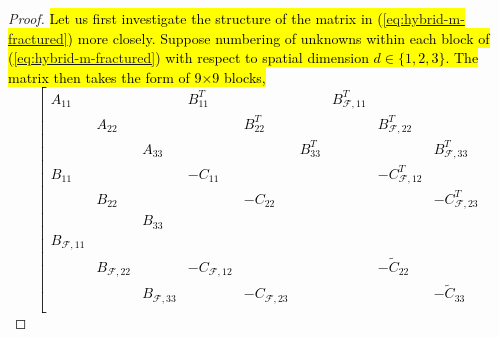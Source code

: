 \def\component{\Omega^c_k}
\begin{proof}
\hl{
Let us first investigate the structure of the matrix in 
(\ref{eq:hybrid-m-fractured}) more closely. 
Suppose numbering of unknowns within each block of (\ref{eq:hybrid-m-fractured}) 
with respect to spatial dimension $d\in\{1,2,3\}$. The matrix then takes the 
form of 9$\times $9 blocks,
\begin{equation}
\label{eq:crazy_blocks_matrix}
\left[
\begin{matrix}
A_{11}             &                    &                    & B^T_{11}            &                     &            & B^T_{\mathcal{F},11}  &                       &                       \\
                   & A_{22}             &                    &                     & B^T_{22}            &            &                       & B^T_{\mathcal{F},22}  &                       \\
                   &                    & A_{33}             &                     &                     &  B^T_{33}  &                       &                       & B^T_{\mathcal{F},33}  \\
B_{11}             &                    &                    & -C_{11}             &                     &            &                       & -C^T_{\mathcal{F},12} &                       \\
                   & B_{22}             &                    &                     & -C_{22}             &            &                       &                       & -C^T_{\mathcal{F},23} \\
                   &                    & B_{33}             &                     &                     &            &                       &                       &                       \\
B_{\mathcal{F},11} &                    &                    &                     &                     &            &                       &                       &                       \\
                   & B_{\mathcal{F},22} &                    & -C_{\mathcal{F},12} &                     &            &                       & -\widetilde{C}_{22}   &                       \\
                   &                    & B_{\mathcal{F},33} &                     & -C_{\mathcal{F},23} &            &                       &                       & -\widetilde{C}_{33}   \\

\end{matrix}
\end{equation}}
\end{proof}
